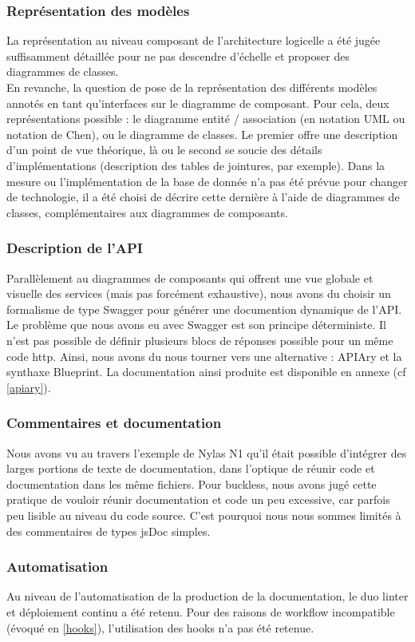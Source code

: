     \subsubsection{Représentation des modèles}
        La représentation au niveau composant de l'architecture logicelle a été jugée suffisamment
        détaillée pour ne pas descendre d'échelle et proposer des diagrammes de classes.\\
        En revanche, la question de pose de la représentation des différents modèles annotés en tant
        qu'interfaces sur le diagramme de composant. Pour cela, deux représentations possible :
        le diagramme entité / association (en notation UML ou notation de Chen), ou le diagramme de
        classes. Le premier offre une description d'un point de vue théorique, là ou le second se
        soucie des détails d'implémentations (description des tables de jointures, par exemple).
        Dans la mesure ou l'implémentation de la base de donnée n'a pas été prévue pour changer de
        technologie, il a été choisi de décrire cette dernière à l'aide de diagrammes de classes,
        complémentaires aux diagrammes de composants.

    \subsubsection{Description de l'API}
        Parallèlement au diagrammes de composants qui offrent une vue globale et visuelle des services
        (mais pas forcément exhaustive), nous avons du choisir un formalisme de type Swagger pour
        générer une documention dynamique de l'API.\\
        Le problème que nous avons eu avec Swagger est son principe déterministe\cite{determinism}.
        Il n'est pas possible de définir plusieurs blocs de réponses possible pour un même code http.
        Ainsi, nous avons du nous tourner vers une alternative : APIAry et la synthaxe Blueprint.
        La documentation ainsi produite est disponible en annexe (cf \ref{apiary}).

    \subsubsection{Commentaires et documentation}
        Nous avons vu au travers l'exemple de Nylas N1 qu'il était possible d'intégrer des larges
        portions de texte de documentation, dans l'optique de réunir code et documentation dans les
        même fichiers. Pour buckless, nous avons jugé cette pratique de vouloir réunir documentation
        et code un peu excessive, car parfois peu lisible au niveau du code source.
        C'est pourquoi nous nous sommes limités à des commentaires de types jsDoc simples.

    \subsubsection{Automatisation}
        Au niveau de l'automatisation de la production de la documentation, le duo linter et
        déploiement continu a été retenu. Pour des raisons de workflow incompatible (évoqué en
        \ref{hooks}), l'utilisation des hooks n'a pas été retenue.